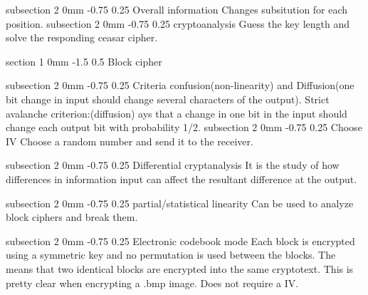 \documentclass[a4paper,11pt]{article}
\makeatletter
\renewcommand{\section}{\@startsection
   {section}%
   {1}%
   {0mm}%
   {-1.5\baselineskip}%
   {0.5\baselineskip}%
   {\sffamily\bfseries\upshape\normalsize}}%
\renewcommand{\subsection}{\@startsection
   {subsection}%
   {2}%
   {0mm}%
   {-0.75\baselineskip}%
   {0.25\baselineskip}%
   {\rmfamily\normalfont\slshape\normalsize}}%
\makeatother
\begin{document}
\subsection{Overall information}
Changes subsitution for each position. 
\subsection{cryptoanalysis}
Guess the key length and solve the responding ceasar cipher.

\section{Block cipher}

\subsection{Criteria}
confusion(non-linearity) and Diffusion(one bit change in input should change several characters of the output).
\newline
\newline 
Strict avalanche criterion:(diffusion) ays that a change in one bit in the input
should change each output bit with probability 1/2.
\subsection{Choose IV}
Choose a random number and send it to the receiver. 

\subsection{Differential cryptanalysis}
It is the study of how differences in information input can affect the resultant difference at the output.

\subsection{partial/statistical linearity}
Can be used to analyze block ciphers and break them.

\subsection{Electronic codebook mode}
Each block is encrypted using a symmetric key and no permutation is used between the blocks. The means that two identical blocks are encrypted into the same cryptotext. This is pretty clear when encrypting a .bmp image. Does not require a IV.
\end{document}
